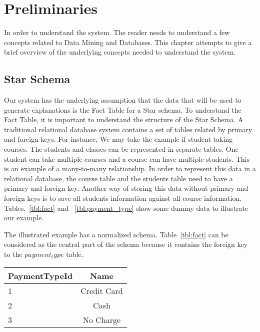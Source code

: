 \chapter{Preliminaries}
\label{chp:prelims}
In order to understand the system. The reader needs to understand a few concepts related to Data Mining and Databases. This chapter attempts to give a brief overview of the underlying concepts needed to understand the system.

\section{Star Schema}
Our system has the underlying assumption that the data that will be used to generate explanations is the Fact Table for a Star schema\citep{giovinazzo2000object,adamson2010star}. To understand the Fact Table, it is important to understand the structure of the Star Schema. A traditional relational database system contains a set of tables related by primary and foreign keys. For instance, We may take the example if student taking courses. The students and classes can be represented in separate tables. One student can take multiple courses and a course can have multiple students. This is an example of a many-to-many relationship.
In order to represent this data in a relational database, the course table and the students table need to have a primary and foreign key. Another way of storing this data without primary and foreign keys is to save all students information against all course information. Tables.~\ref{tbl:fact} and ~\ref{tbl:payment_type} show some dummy data to illustrate our example.

The illustrated example has a normalized schema\citep{beeri1988sophisticate}. Table~\ref{tbl:fact} can be considered as the central part of the schema because it contains the foreign key to the $payment_type$ table.



\begin{center}
  \begin{tabular}{ | l | c | }
    \hline
    \textbf{PaymentTypeId} & \textbf{Name} \\ \hline
    1 & Credit Card  \\ \hline
    2 & Cash  \\ \hline
    3 & No Charge  \\
    \hline
  \end{tabular}
\end{center}
\label{tbl:payment_type}

